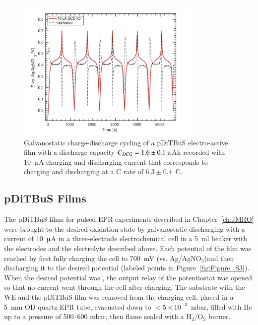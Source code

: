 \begin{figure}[h]
\center
	\includegraphics[width=0.8\textwidth]{./electrochemistry/figures/GCD_pDiTBuS.pdf}
	\caption{Galvanostatic charge-discharge cycling of a pDiTBuS electro-active film with a discharge capacity $C_{DCG}=1.6\pm0.1~\muup$Ah recorded with 10~$\muup$A charging and discharging current that corresponds to charging and discharging at a C rate of $6.3\pm0.4$~C.}
	\label{fig:GCD_DiTBuS}
\end{figure}

\par
\subsection{pDiTBuS Films}
The pDiTBuS films for pulsed EPR experiments described in Chapter~\ref{ch:JMRO} were brought to the desired oxidation state by galvanostatic discharging with a current of 10~$\muup$A in a three-electrode electrochemical cell in a 5~ml beaker with the electrodes and the electrolyte described above.
Each potential of the film was reached by first fully charging the cell to 700~mV (vs. Ag/AgNO$_3$)and then discharging it to the desired potential (labeled points in Figure~\ref{fig:Figure_S3}). When the desired potential was , the output relay of the potentiostat was opened so that no current went through the cell after charging. The substrate with the WE and the pDiTBuS film was removed from the charging cell, placed in a 5~mm OD quartz EPR tube, evacuated down to $<5\times10^{-3}$~mbar, filled with He up to a pressure of 500--600 mbar, then flame sealed with a H$_2$/O$_2$ burner.

